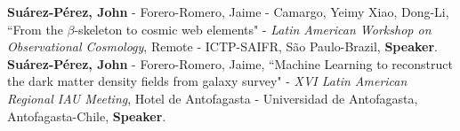 \documentclass[10pt, a4paper]{article}
\newcommand{\years}[1]{\marginnote{\scriptsize #1}}
\begin{document}
\years{2020}\textbf{Suárez-Pérez, John} - Forero-Romero, Jaime - Camargo, Yeimy  Xiao, Dong-Li, “From the $\beta$-skeleton to cosmic web elements" - \emph{Latin American Workshop on Observational Cosmology}, Remote - ICTP-SAIFR, São Paulo-Brazil, \textbf{Speaker}.\\




\years{2019}\textbf{Suárez-Pérez, John} - Forero-Romero, Jaime, “Machine Learning to reconstruct the dark matter density fields from galaxy survey" - \emph{XVI Latin American Regional IAU Meeting}, Hotel de Antofagasta - Universidad de Antofagasta, Antofagasta-Chile, \textbf{Speaker}.\\



\end{document}
